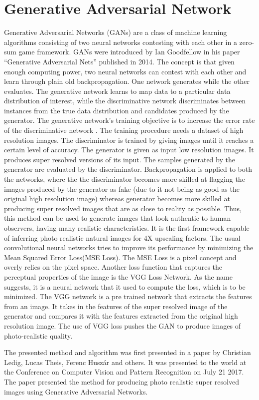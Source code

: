 \section{Generative Adversarial Network}
Generative Adversarial Networks (GANs) are a class of machine learning algorithms consisting of two neural networks contesting with each other in a zero-sum game framework. GANs were introduced by Ian Goodfellow in his paper “Generative Adversarial Nets” published in 2014. The concept is that given enough computing power, two neural networks can contest with each other and learn through plain old backpropagation. One network generates while the other evaluates. The generative network learns to map data to a particular data distribution of interest, while the discriminative network discriminates between instances from the true data distribution and candidates produced by the generator. The generative network's training objective is to increase the error rate of the discriminative network .   
The training procedure needs a dataset of high resolution images. The discriminator is trained by giving images until it reaches a certain level of accuracy. The generator is given as input low resolution images. It produces super resolved versions of its input. The samples generated by the generator are evaluated by the discriminator. Backpropagation is applied to both the networks, where the the discriminator becomes more skilled at flagging the images produced by the generator as fake (due to it not being as good as the original high resolution image) whereas generator becomes more skilled at producing super resolved images that are as close to reality as possible. Thus, this method can be used to generate images that look authentic to human observers, having many realistic characteristics.  It is the first framework capable of inferring photo realistic natural images for 4X upscaling factors. 
The usual convolutional neural networks tries to improve its performance by minimizing the Mean Squared Error Loss(MSE Loss). The MSE Loss is a pixel concept and overly relies on the pixel space. Another loss function that captures the perceptual properties of the image is the VGG Loss Network. As the name suggests, it is a neural network that it used to compute the loss, which is to be minimized. The VGG network is a pre trained network that extracts the features from an image. It takes in the features of the super resolved image of the generator and compares it with the features extracted from the original high resolution image. The use of VGG loss pushes the GAN to produce images of photo-realistic quality.

The presented method and algorithm was first  presented in a paper by Christian Ledig, Lucas Theis, Ferenc Huszár and others. It was presented to the world at the Conference on Computer Vision and Pattern Recognition on July 21 2017. The paper presented the method for producing photo realistic super resolved images using Generative Adversarial Networks. 